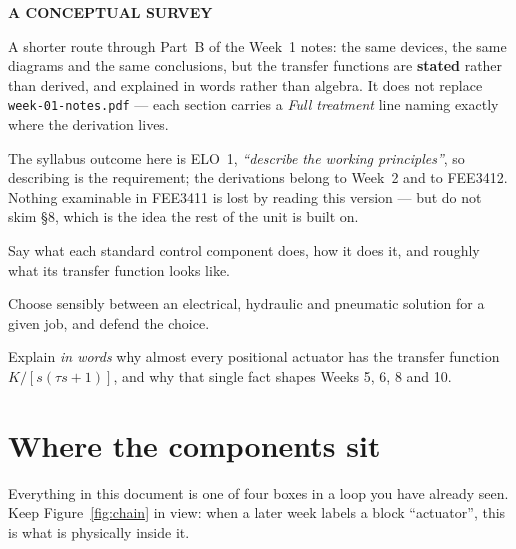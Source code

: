 \documentclass[11pt,a4paper]{article}
\begin{document}
\weektitle

\begin{center}
{\large\sffamily\bfseries\color{fnavy}A CONCEPTUAL SURVEY}
\end{center}

\bigskip
\begin{readingbox}
A shorter route through Part~B of the Week~1 notes: the same devices, the same
diagrams and the same conclusions, but the transfer functions are
\textbf{stated} rather than derived, and explained in words rather than algebra.
It does not replace \texttt{week-01-notes.pdf} --- each section carries a
\emph{Full treatment} line naming exactly where the derivation lives.

\smallskip
The syllabus outcome here is ELO~1, \emph{``describe the working principles''},
so describing is the requirement; the derivations belong to Week~2 and to
FEE3412. Nothing examinable in FEE3411 is lost by reading this version --- but
do not skim \S8, which is the idea the rest of the unit is built on.
\end{readingbox}

\bigskip
\begin{outcomes}
\item Say what each standard control component does, how it does it, and
      roughly what its transfer function looks like.
\item Choose sensibly between an electrical, hydraulic and pneumatic solution
      for a given job, and defend the choice.
\item Explain \emph{in words} why almost every positional actuator has the
      transfer function $K/[s(\tau s+1)]$, and why that single fact shapes
      Weeks 5, 6, 8 and 10.
\end{outcomes}

\section{Where the components sit}

Everything in this document is one of four boxes in a loop you have already
seen. Keep Figure~\ref{fig:chain} in view: when a later week labels a block
``actuator'', this is what is physically inside it.
\end{document}
